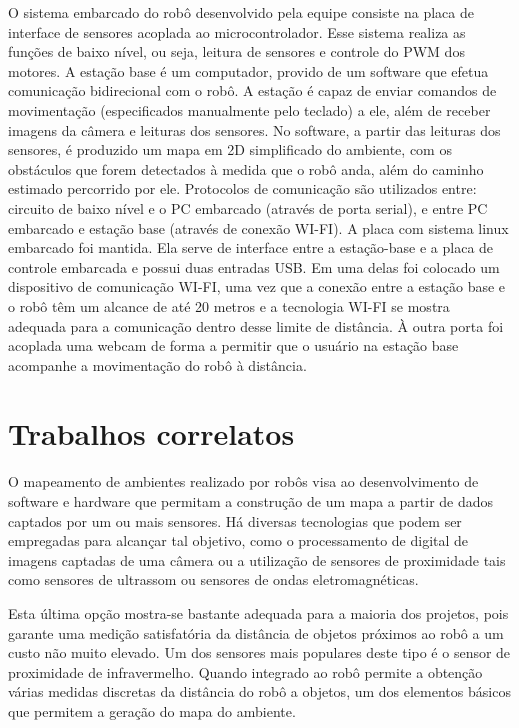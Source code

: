 O sistema embarcado do robô desenvolvido pela equipe consiste na placa de interface de sensores acoplada ao microcontrolador. Esse sistema realiza as funções de baixo nível, ou seja, leitura de sensores e controle do PWM dos motores. A estação base é um computador, provido de um software que efetua comunicação bidirecional com o robô. A estação é capaz de enviar comandos de movimentação (especificados manualmente pelo teclado) a ele, além de receber imagens da câmera e leituras dos sensores. No software, a partir das leituras dos sensores, é produzido um mapa em 2D simplificado do ambiente, com os obstáculos que forem detectados à medida que o robô anda, além do caminho estimado percorrido por ele. Protocolos de comunicação são utilizados entre: circuito de baixo nível e o PC embarcado (através de porta serial), e entre PC embarcado e estação base (através de conexão WI-FI). A placa com sistema linux embarcado foi mantida. Ela serve de interface entre a estação-base e a placa de controle embarcada e possui duas entradas USB. Em uma delas foi colocado um dispositivo de comunicação WI-FI, uma vez que a conexão entre a estação base e o robô têm um alcance de até 20 metros e a tecnologia WI-FI se mostra adequada para a comunicação dentro desse limite de distância. À outra porta foi acoplada uma webcam de forma a permitir que o usuário na estação base acompanhe a movimentação do robô à distância.

\section{Trabalhos correlatos}

O mapeamento de ambientes realizado por robôs visa ao desenvolvimento de software e hardware que permitam a construção de um mapa a partir de dados captados por um ou mais sensores. Há diversas tecnologias que podem ser empregadas para alcançar tal objetivo, como o processamento de digital de imagens captadas de uma câmera ou a utilização de sensores de proximidade tais como sensores de ultrassom ou sensores de ondas eletromagnéticas.

Esta última opção mostra-se bastante adequada para a maioria dos projetos, pois garante uma medição satisfatória da distância de objetos próximos ao robô a um custo não muito elevado. Um dos sensores mais populares deste tipo é o sensor de proximidade de infravermelho. Quando integrado ao robô permite a obtenção várias medidas discretas da distância do robô a objetos, um dos elementos básicos que permitem a geração do mapa do ambiente.

